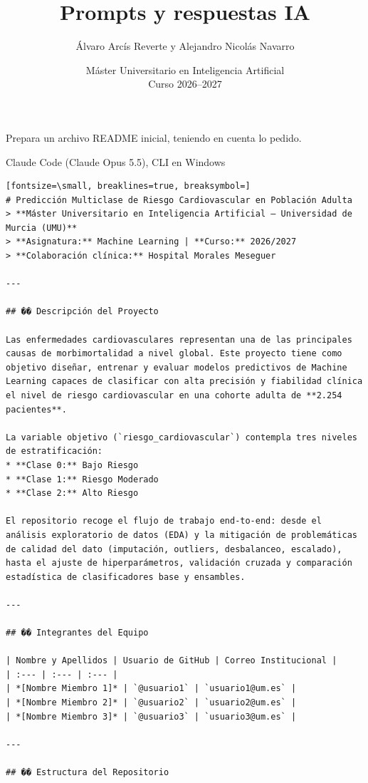 \documentclass[12pt,a4paper,oneside]{book}
\title{Prompts y respuestas IA}
\author{Álvaro Arcís Reverte y Alejandro Nicolás Navarro}
\date{Máster Universitario en Inteligencia Artificial \\ Curso 2026--2027}
\begin{document}
\maketitle

\cleardoublepage



\begin{iaprompt}
Prepara un archivo README inicial, teniendo en cuenta lo pedido.
\end{iaprompt}
\begin{iaresp}{Claude Code (Claude Opus 5.5), CLI en Windows}
\begin{Verbatim}[fontsize=\small, breaklines=true, breaksymbol=]
# Predicción Multiclase de Riesgo Cardiovascular en Población Adulta
> **Máster Universitario en Inteligencia Artificial — Universidad de Murcia (UMU)**  
> **Asignatura:** Machine Learning | **Curso:** 2026/2027  
> **Colaboración clínica:** Hospital Morales Meseguer  

---

## �� Descripción del Proyecto

Las enfermedades cardiovasculares representan una de las principales causas de morbimortalidad a nivel global. Este proyecto tiene como objetivo diseñar, entrenar y evaluar modelos predictivos de Machine Learning capaces de clasificar con alta precisión y fiabilidad clínica el nivel de riesgo cardiovascular en una cohorte adulta de **2.254 pacientes**.

La variable objetivo (`riesgo_cardiovascular`) contempla tres niveles de estratificación:
* **Clase 0:** Bajo Riesgo
* **Clase 1:** Riesgo Moderado
* **Clase 2:** Alto Riesgo

El repositorio recoge el flujo de trabajo end-to-end: desde el análisis exploratorio de datos (EDA) y la mitigación de problemáticas de calidad del dato (imputación, outliers, desbalanceo, escalado), hasta el ajuste de hiperparámetros, validación cruzada y comparación estadística de clasificadores base y ensambles.

---

## �� Integrantes del Equipo

| Nombre y Apellidos | Usuario de GitHub | Correo Institucional |
| :--- | :--- | :--- |
| *[Nombre Miembro 1]* | `@usuario1` | `usuario1@um.es` |
| *[Nombre Miembro 2]* | `@usuario2` | `usuario2@um.es` |
| *[Nombre Miembro 3]* | `@usuario3` | `usuario3@um.es` |

---

## �� Estructura del Repositorio


\end{Verbatim}
\end{iaresp}
\end{document}

